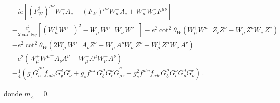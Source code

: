 \begin{frame}
\begin{align}
&-ie\left[(F_W^\dagger)^{\mu\nu}W_\mu^+ A_\nu-(F_W)^{\mu\nu}W_\mu^- A_\nu+W_\mu^-W_\nu^+F^{\mu\nu}\right]\nonumber\\
&-\frac{e^2}{2\sin^2\theta_W}\left[\left(W_\mu^+{W^\mu}^-\right)^2-W_\mu^+{W^\mu}^+W_\nu^-{W^\nu}^-\right]
-e^2\cot^2\theta_W\left(W_\mu^+{W^\mu}^-Z_\nu Z^\nu-W_\mu^+Z^\mu W_\nu^-Z^\nu\right)\nonumber\\
&-e^2\cot^2\theta_W\left(2W_\mu^+{W^\mu}^-A_\nu Z^\nu-W_\mu^+A^\mu W_\nu^-Z^\nu-W_\mu^+Z^\mu W_\nu^-A^\nu\right)\nonumber\\
&-e^2\left(W_\mu^+{W^\mu}^-A_\nu A^\nu-W_\mu^+A^\mu W_\nu^-A^\nu\right)\nonumber\\
&- \frac{1}{4}\left(g_s\widetilde{G}^{\mu\nu}_af_{a d e}G^d_\mu G^e_\nu
    +g_sf^{a b c}G_b^\mu G_c^\nu\widetilde{G}_{\mu\nu}^a
    +g_s^2f^{a b c}f_{a d e}G_b^\mu G_c^\nu G^d_\mu G^e_\nu\right)\,.
\end{align}


donde $m_{\nu_l}=0$.

\end{frame}


